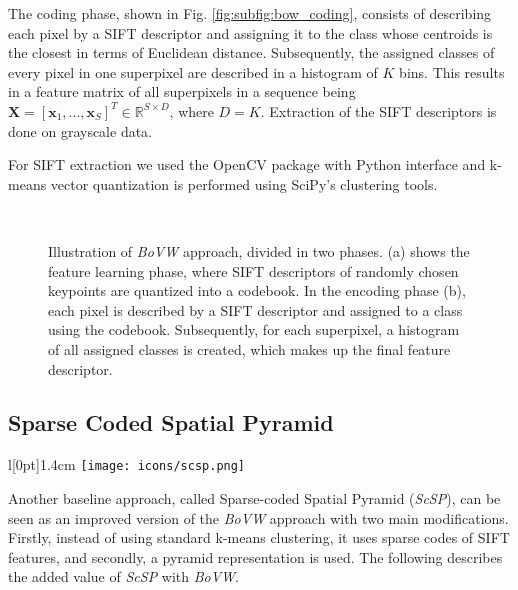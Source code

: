 The coding phase, shown in Fig. \ref{fig:subfig:bow_coding}, consists of describing each pixel by a SIFT descriptor and assigning it to the class whose centroids is the closest in terms of Euclidean distance. Subsequently, the assigned classes of every pixel in one superpixel are described in a histogram of $K$ bins. This results in a feature matrix of all superpixels in a sequence being $\boldsymbol{X} = [\boldsymbol{x}_1,...,\boldsymbol{x}_S]^T \in \mathbb{R}^{S \times D}$, where $D = K$. Extraction of the SIFT descriptors is done on grayscale data.

For SIFT extraction we used the OpenCV \cite{openCV} package with Python interface and k-means vector quantization is performed using SciPy's \cite{scipy} clustering tools.

\begin{figure}[htbp]
  \centering
  \\
  \caption[BoVW illustration]{Illustration of \textit{BoVW} approach, divided in two phases. (a) shows the feature learning phase, where SIFT descriptors of randomly chosen keypoints are quantized into a codebook. In the encoding phase (b), each pixel is described by a SIFT descriptor and assigned to a class using the codebook. Subsequently, for each superpixel, a histogram of all assigned classes is created, which makes up the final feature descriptor.}
  \label{fig:BoVW_approch}  
\end{figure}

\subsection{Sparse Coded Spatial Pyramid} \label{scp}
\begingroup
\setlength\intextsep{0pt}
\begin{wrapfigure}[4]{l}[0pt]{1.4cm}
\texttt{[image: icons/scsp.png]}
\end{wrapfigure}

Another baseline approach, called Sparse-coded Spatial Pyramid (\textit{ScSP}), can be seen as an improved version of the \textit{BoVW} approach with two main modifications. Firstly, instead of using standard k-means clustering, it uses sparse codes of SIFT features, and secondly, a pyramid representation is used. The following describes the added value of \textit{ScSP} with \textit{BoVW}.

